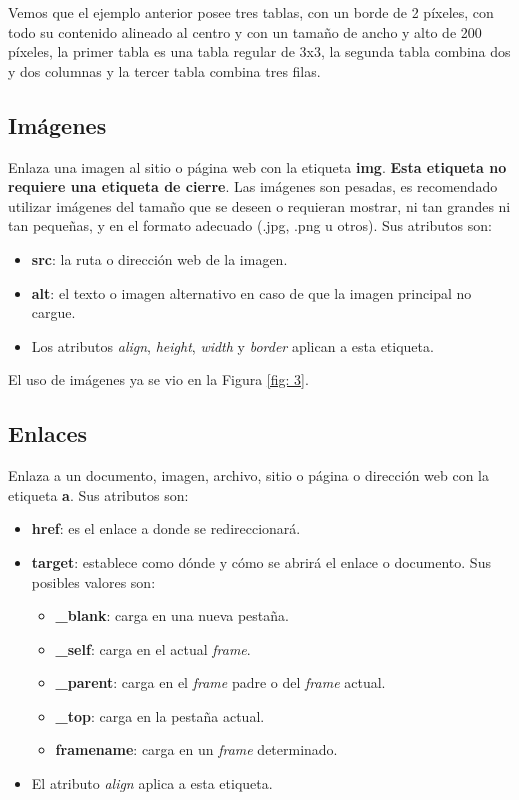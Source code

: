 Vemos que el ejemplo anterior posee tres tablas, con un borde de 2 píxeles, con todo su contenido alineado al centro y con un tamaño de ancho y alto de 200 píxeles, la primer tabla es una tabla regular de 3x3, la segunda tabla combina dos y dos columnas y la tercer tabla combina tres filas.


\subsection{Imágenes}

Enlaza una imagen al sitio o página web con la etiqueta \textbf{img}. \textbf{Esta etiqueta no requiere una etiqueta de cierre}. Las imágenes son pesadas, es recomendado utilizar imágenes del tamaño que se deseen o requieran mostrar, ni tan grandes ni tan pequeñas, y en el formato adecuado (.jpg, .png u otros). Sus atributos son:
\begin{itemize}
    \item \textbf{src}: la ruta o dirección web de la imagen.
    \item \textbf{alt}: el texto o imagen alternativo en caso de que la imagen principal no cargue.
    \item Los atributos \textit{align}, \textit{height}, \textit{width} y \textit{border} aplican a esta etiqueta.
\end{itemize}

El uso de imágenes ya se vio en la Figura \ref{fig: 3}.


\subsection{Enlaces}

Enlaza a un documento, imagen, archivo, sitio o página o dirección web con la etiqueta \textbf{a}. Sus atributos son:
\begin{itemize}
    \item \textbf{href}: es el enlace a donde se redireccionará.
    \item \textbf{target}: establece como dónde y cómo se abrirá el enlace o documento. Sus posibles valores son:
    \begin{itemize}
        \item \textbf{\_blank}: carga en una nueva pestaña.
        \item \textbf{\_self}: carga en el actual \textit{frame}.
        \item \textbf{\_parent}: carga en el \textit{frame} padre o del \textit{frame} actual.
        \item \textbf{\_top}: carga en la pestaña actual.
        \item \textbf{framename}: carga en un \textit{frame} determinado.
    \end{itemize}
    \item El atributo \textit{align} aplica a esta etiqueta.
\end{itemize}

